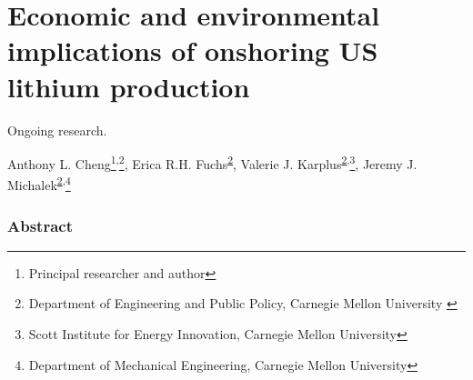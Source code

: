 \chapter{Economic and environmental implications of onshoring US lithium production}\label{chap:lith}

\begin{center} 
    Ongoing research. 

    Anthony L. Cheng\footnote{Principal researcher and author}\textsuperscript{,}\footnote{Department of Engineering and Public Policy, Carnegie Mellon University \label{ch4-note1}}, Erica R.H. Fuchs\textsuperscript{\ref{ch4-note1}}, Valerie J. Karplus\textsuperscript{\ref{ch4-note1},}\footnote{Scott Institute for Energy Innovation, Carnegie Mellon University}, Jeremy J. Michalek\textsuperscript{\ref{ch4-note1},}\footnote{Department of Mechanical Engineering, Carnegie Mellon University}
\end{center}

\clearpage

\subsection{Abstract}


